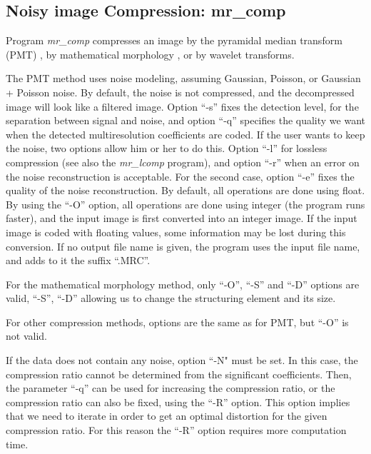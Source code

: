 \subsection{Noisy image Compression: mr\_comp}

Program {\em mr\_comp} compresses an 
image by the pyramidal median transform (PMT)
\cite{starck:sta96_2,starck:sta96_3,starck:mur98_2,starck:mur96_1}, 
by mathematical morphology \cite{compress:huang91_1}, or by wavelet 
transforms.

The PMT method uses noise modeling,
assuming Gaussian, Poisson, or Gaussian + Poisson noise. By default, the
noise is not compressed, and the decompressed image will look like a 
filtered image. Option ``-s'' fixes the detection level, for the separation
 between signal and noise, and option ``-q'' specifies the quality we want 
 when the detected multiresolution coefficients are coded. 
 If the user wants to  keep the noise, two options allow him or her
to do this.
  Option ``-l'' for lossless compression (see also the 
{\em mr\_lcomp} program), 
and
option ``-r'' when an error on the noise reconstruction is acceptable. For 
the second case, option ``-e'' fixes the quality of the noise reconstruction.
By default, all operations are done using float. By using the ``-O'' option,
all operations are done using integer (the program runs faster),
 and the input image is first converted into an integer image. 
If the input image is coded with 
floating values, some information may be lost during this conversion.
If no output file name is given, the program uses the input file name, and
adds to it the suffix ``.MRC''. 

For the mathematical morphology method, only  ``-O'', ``-S'' and ``-D'' 
options are valid, ``-S'', ``-D'' allowing us to change
the structuring element and its size.

For other compression methods, options are the same as for PMT, but ``-O''
is not valid.

If the data does not contain any noise, option ``-N" must be set. In this case,
the compression ratio cannot be determined from the significant coefficients. 
Then, the parameter ``-q'' can be used for increasing the compression ratio,
or the compression ratio can also be fixed, using the ``-R'' option. This
option implies that we need to iterate in order to get an optimal distortion
for the given compression ratio. For this reason the ``-R'' 
option requires more
computation time. 

